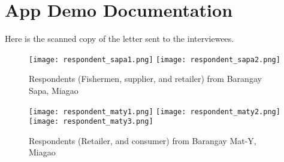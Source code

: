 %
%
%                 

\chapter{App Demo Documentation}
\label{sec:appendixd}


Here is the scanned copy of the letter sent to the interviewees.

\begin{figure}[h!]
  \centering
  \texttt{[image: respondent\_sapa1.png]}
  \hfill
  \texttt{[image: respondent\_sapa2.png]}
  \caption{Respondents (Fishermen, supplier, and retailer) from Barangay Sapa, Miagao}
  \label{fig:home_and_dashboard}
\end{figure}

\begin{figure}[h!]
  \centering
  \texttt{[image: respondent\_maty1.png]}
  \hfill
  \texttt{[image: respondent\_maty2.png]}
  \hfill
  \texttt{[image: respondent\_maty3.png]}
  \caption{Respondents (Retailer, and consumer) from Barangay Mat-Y, Miagao}
  \label{fig:home_and_dashboard}
\end{figure}
